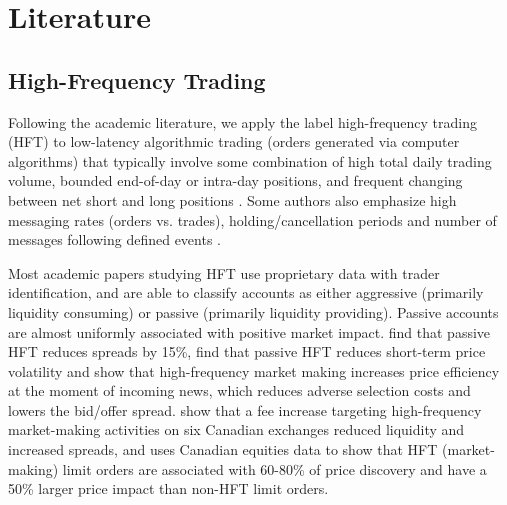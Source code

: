 
\section{Literature \label{Literature}}

\subsection{High-Frequency Trading}

Following the academic literature, we apply the label high-frequency trading (HFT) to low-latency algorithmic trading (orders generated via computer algorithms) that typically involve some combination of high total daily trading volume, bounded end-of-day or intra-day positions, and frequent changing between net short and long positions \cite[e.g.]{Kirilenko2015, Clark-Joseph2013}. Some authors also emphasize high messaging rates (orders vs. trades), holding/cancellation periods and number of messages following defined events \cite[e.g.]{Malinova2014}.

Most academic papers studying HFT use proprietary data with trader identification, and are able to classify accounts as either aggressive (primarily liquidity consuming) or passive (primarily liquidity providing). Passive accounts are almost uniformly associated with positive market impact. \cite{Jovanovic2015} find that passive HFT reduces spreads by 15\%, \cite{Hagstromer2013} find that passive HFT reduces short-term price volatility and \cite{Menkveld2015b} show that high-frequency market making increases price efficiency at the moment of incoming news, which reduces adverse selection costs and lowers the bid/offer spread. \cite{Malinova2014} show that a fee increase targeting high-frequency market-making activities on six Canadian exchanges reduced liquidity and increased spreads, and \cite{Brogaard2015b} uses Canadian equities data to show that HFT (market-making) limit orders are associated with 60-80\% of price discovery and have a 50\% larger price impact than non-HFT limit orders.

